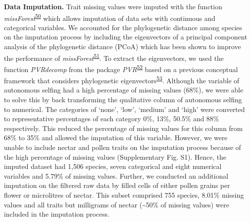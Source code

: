 \documentclass[12pt,a4paper,]{article}
\begin{document}
\textbf{Data Imputation.} Trait missing values were imputed with the
function
\emph{missForest}\textsuperscript{\protect\hyperlink{ref-stekhoven2012}{50}}
which allows imputation of data sets with continuous and categorical
variables. We accounted for the phylogenetic distance among species on
the imputation process by including the eigenvectors of a principal
component analysis of the phylogenetic distance (PCoA) which has been
shown to improve the performance of
\emph{missForest}\textsuperscript{\protect\hyperlink{ref-penone2014}{51}}.
To extract the eigenvectors, we used the function \emph{PVRdecomp} from
the package
\emph{PVR}\textsuperscript{\protect\hyperlink{ref-santos2018}{52}} based
on a previous conceptual framework that considers phylogenetic
eigenvectors\textsuperscript{\protect\hyperlink{ref-diniz-filho2012}{53}}.
Although the variable of autonomous selfing had a high percentage of
missing values (68\%), we were able to solve this by back transforming
the qualitative column of autonomous selfing to numerical. The
categories of `none', `low', `medium' and `high' were converted to
representative percentages of each category 0\%, 13\%, 50.5\% and 88\%
respectively. This reduced the percentage of missing values for this
column from 68\% to 35\% and allowed the imputation of this variable.
However, we were unable to include nectar and pollen traits on the
imputation process because of the high percentage of missing values
(Supplementary Fig. S1). Hence, the imputed dataset had 1,506 species,
seven categorical and eight numerical variables and 5.79\% of missing
values. Further, we conducted an additional imputation on the filtered
raw data by filled cells of either pollen grains per flower or
microlitres of nectar. This subset comprised 755 species, 8.01\% missing
values and all traits but milligrams of nectar (\textasciitilde{}50\% of
missing values) were included in the imputation process.
\end{document}
